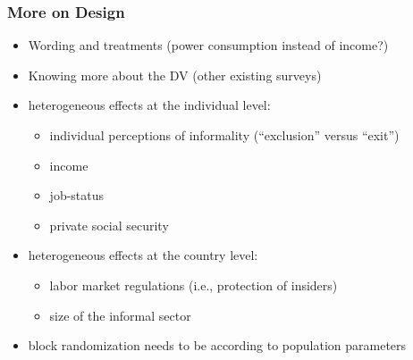 \documentclass{beamer}\usepackage[]{graphicx}\usepackage[]{color}
\begin{document}
\begin{frame}\frametitle{More on Design}
    


\begin{itemize}
	\item Wording and treatments (power consumption instead of income?)
	\item Knowing more about the DV (other existing surveys)
	\item heterogeneous effects at the individual level: 
	\begin{itemize}
		\item individual perceptions of informality (``exclusion'' versus ``exit'')
		\item income
		\item job-status
		\item private social security
	\end{itemize}
	\item heterogeneous effects at the country level:
		\begin{itemize}
		 	\item labor market regulations (i.e., protection of insiders)
		 	\item size of the informal sector
		 \end{itemize} 
	\item block randomization needs to be according to population parameters
\end{itemize}

\end{frame}
\end{document}
